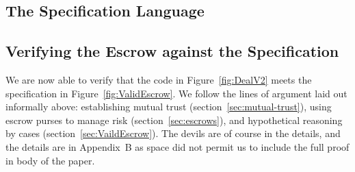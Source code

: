 %

%




 \subsection{The Specification Language \Chainmail}



\subsection{Verifying the Escrow against the Specification}

We are now able to verify that the code in
Figure~\ref{fig:DealV2} meets the specification in
Figure~\ref{fig:ValidEscrow}. We follow the lines of argument laid out
informally above:
establishing mutual trust
(section~\ref{sec:mutual-trust}),
using escrow purses to manage risk (section~\ref{sec:escrows}),
and hypothetical reasoning by cases (section~\ref{sec:VaildEscrow}).
The devils are of course in the details, and the details are in
Appendix~B as space did not permit us to include the full proof in
body of the paper.

